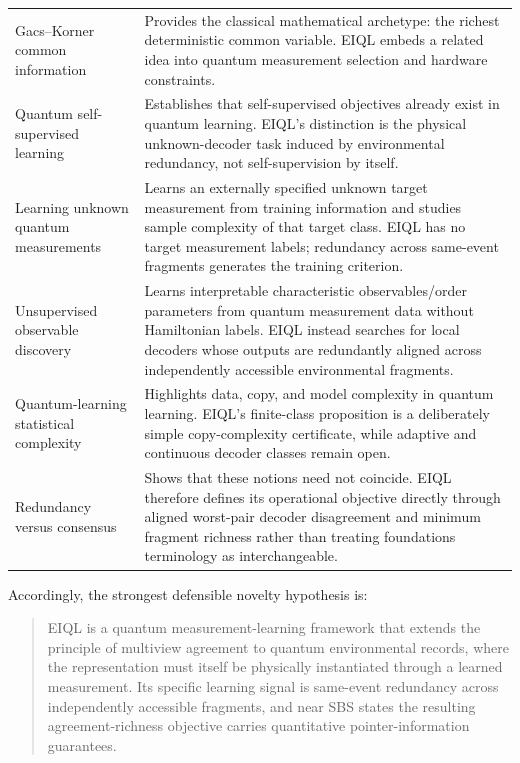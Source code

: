 \begin{table}[H]
\begin{tabularx}{\textwidth}{>{\raggedright\arraybackslash}p{}X}
Gacs--Korner common information \cite{gacs1973,csirmaz2023} & Provides the classical mathematical archetype: the richest deterministic common variable. EIQL embeds a related idea into quantum measurement selection and hardware constraints.\\
Quantum self-supervised learning \cite{jaderberg2021} & Establishes that self-supervised objectives already exist in quantum learning. EIQL's distinction is the physical unknown-decoder task induced by environmental redundancy, not self-supervision by itself.\\
Learning unknown quantum measurements \cite{cheng2016} & Learns an externally specified unknown target measurement from training information and studies sample complexity of that target class. EIQL has no target measurement labels; redundancy across same-event fragments generates the training criterion.\\
Unsupervised observable discovery \cite{sadoune2023} & Learns interpretable characteristic observables/order parameters from quantum measurement data without Hamiltonian labels. EIQL instead searches for local decoders whose outputs are redundantly aligned across independently accessible environmental fragments.\\
Quantum-learning statistical complexity \cite{banchi2023} & Highlights data, copy, and model complexity in quantum learning. EIQL's finite-class proposition is a deliberately simple copy-complexity certificate, while adaptive and continuous decoder classes remain open.\\
Redundancy versus consensus \cite{chisholm2023} & Shows that these notions need not coincide. EIQL therefore defines its operational objective directly through aligned worst-pair decoder disagreement and minimum fragment richness rather than treating foundations terminology as interchangeable.\\
\bottomrule
\end{tabularx}
\end{table}

Accordingly, the strongest defensible novelty hypothesis is:

\begin{quote}
EIQL is a quantum measurement-learning framework that extends the principle of multiview agreement to quantum environmental records, where the representation must itself be physically instantiated through a learned measurement. Its specific learning signal is same-event redundancy across independently accessible fragments, and near SBS states the resulting agreement-richness objective carries quantitative pointer-information guarantees.
\end{quote}

